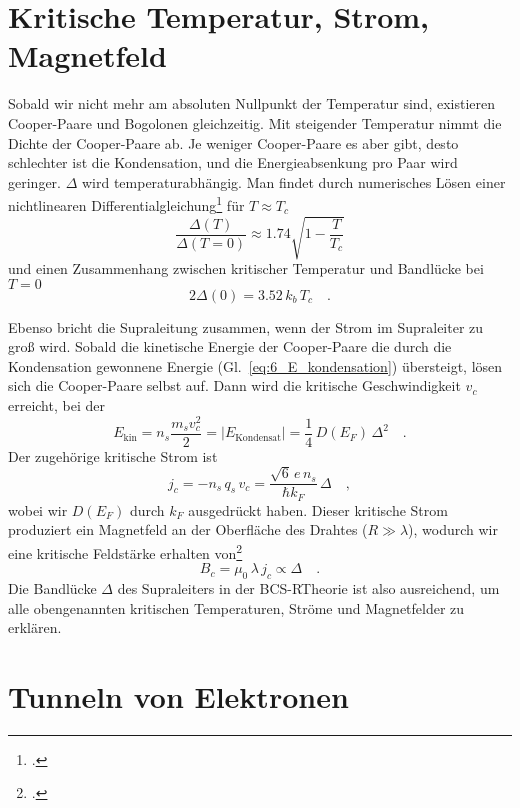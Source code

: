 \section*{Kritische Temperatur, Strom, Magnetfeld}

Sobald wir nicht mehr am absoluten Nullpunkt der Temperatur sind, existieren Cooper-Paare und Bogolonen gleichzeitig. Mit steigender Temperatur nimmt die Dichte der Cooper-Paare ab. Je weniger Cooper-Paare es aber gibt, desto schlechter ist die Kondensation, und die Energieabsenkung pro Paar wird geringer. $\Delta$ wird temperaturabhängig. Man findet durch numerisches Lösen einer nichtlinearen Differentialgleichung\footcite{Gross_FK} für $T \approx T_c$
\begin{equation}
    \frac{\Delta(T)}{\Delta(T=0)} \approx 1.74 \sqrt{1 - \frac{T}{T_c}}
\end{equation}
und einen Zusammenhang zwischen kritischer Temperatur und Bandlücke bei $T=0$
\begin{equation}
    2 \Delta(0) = 3.52  \, k_b  \, T_c \quad .
\end{equation}

Ebenso bricht die Supraleitung zusammen, wenn der Strom im Supraleiter zu groß wird. Sobald die kinetische Energie der Cooper-Paare die durch die Kondensation gewonnene Energie (Gl.~\ref{eq:6_E_kondensation}) übersteigt, lösen sich die Cooper-Paare selbst auf. Dann wird die kritische Geschwindigkeit $v_c$ erreicht, bei der 
\begin{equation}
    E_\text{kin} = n_s \frac{m_s v_c^2}{2} =  | E_\text{Kondensat} |  = \frac{1}{4} \, D(E_F) \, \Delta^2 \quad .
\end{equation}
Der zugehörige kritische Strom ist
\begin{equation}
    j_c = - n_s \, q_s \,  v_c = \frac{\sqrt{6 } \,  e \, n_s}{\hbar k_F} \, \Delta \quad ,
\end{equation}
wobei wir $D(E_F)$ durch $k_F$ ausgedrückt haben. Dieser kritische Strom produziert ein Magnetfeld an der Oberfläche des Drahtes ($R \gg \lambda$), wodurch wir eine kritische Feldstärke erhalten von\footcite{Hunklinger2014}
\begin{equation}
 B_c = \mu_0 \, \lambda \, j_c  \propto \Delta \quad .
\end{equation}
Die Bandlücke $\Delta$ des Supraleiters in der BCS-RTheorie ist also ausreichend, um alle obengenannten kritischen Temperaturen, Ströme und Magnetfelder zu erklären.

\section{Tunneln von Elektronen}

